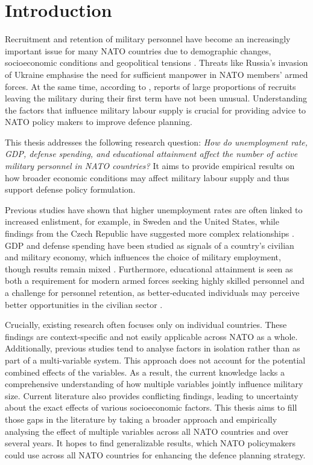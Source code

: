\chapter{Introduction}

Recruitment and retention of military personnel have become an increasingly important issue for many NATO countries due to demographic changes, socioeconomic conditions and geopolitical tensions \parencite{nato_research_and_technology_organization_recruiting_2007,nato_nato_2022}.
Threats like Russia's invasion of Ukraine emphasise the need for sufficient manpower in NATO members' armed forces. 
At the same time, according to \textcite{nato_research_and_technology_organization_recruiting_2007}, reports of large proportions of recruits leaving the military during their first term have not been unusual.
Understanding the factors that influence military labour supply is crucial for providing advice to NATO policy makers to improve defence planning.

This thesis addresses the following research question: \textit{How do unemployment rate, GDP, defense spending, and educational attainment affect the number of active military personnel in NATO countries?}
It aims to provide empirical results on how broader economic conditions may affect military labour supply and thus support defense policy formulation.

Previous studies have shown that higher unemployment rates are often linked to increased enlistment, for example, in Sweden and the United States, while findings from the Czech Republic have suggested more complex relationships \parencite{backstrom_are_2019,asch_cash_2010,holcner_military_2021}. 
GDP and defense spending have been studied as signals of a country's civilian and military economy, which influences the choice of military employment, though results remain mixed \parencite{warner_chapter_1995,holcner_military_2021}. 
Furthermore, educational attainment is seen as both a requirement for modern armed forces seeking highly skilled personnel and a challenge for personnel retention, as better-educated individuals may perceive better opportunities in the civilian sector \parencite{cnas_resources_and_force_readiness_division_fiscal_nodate,hof_quality_2023}.

Crucially, existing research often focuses only on individual countries. 
These findings are context-specific and not easily applicable across NATO as a whole. 
Additionally, previous studies tend to analyse factors in isolation rather than as part of a multi-variable system. 
This approach does not account for the potential combined effects of the variables. 
As a result, the current knowledge lacks a comprehensive understanding of how multiple variables jointly influence military size. 
Current literature also provides conflicting findings, leading to uncertainty about the exact effects of various socioeconomic factors. 
This thesis aims to fill those gaps in the literature by taking a broader approach and empirically analysing the effect of multiple variables across all NATO countries and over several years.
It hopes to find generalizable results, which NATO policymakers could use across all NATO countries for enhancing the defence planning strategy.

